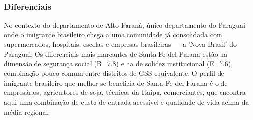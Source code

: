 \subsubsection*{Diferenciais}\label{dif-santa-fe-del-parana-1020}
No contexto do departamento de Alto Paraná, único departamento do Paraguai onde o imigrante brasileiro chega a uma comunidade já consolidada com supermercados, hospitais, escolas e empresas brasileiras — a 'Nova Brasil' do Paraguai. Os diferenciais mais marcantes de Santa Fe del Parana estão na dimensão de segurança social (B=7.8) e na de solidez institucional (E=7.6), combinação pouco comum entre distritos de GSS equivalente. O perfil de imigrante brasileiro que melhor se beneficia de Santa Fe del Parana é o de empresários, agricultores de soja, técnicos da Itaipu, comerciantes, que encontra aqui uma combinação de custo de entrada acessível e qualidade de vida acima da média regional.
